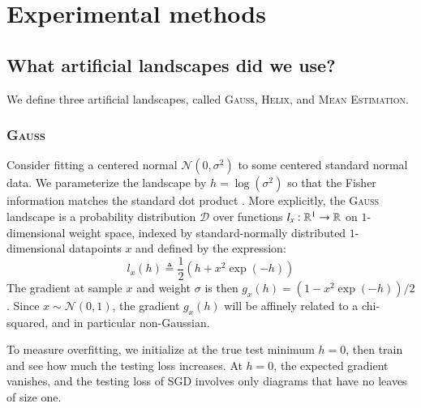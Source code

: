 \documentclass[anon,12pt]{colt2021} %
\newcommand{\wrap}[1]{\left(#1\right)}
\newcommand{\Dd}{\mathcal{D}}
\newcommand{\Nn}{\mathcal{N}}   \newcommand{\NN}{\mathbb{N}}
\newcommand{\Gauss}{\textsc{Gauss}}
\newcommand{\Helix}{\textsc{Helix}}
\newcommand{\MeanEstimation}{\textsc{Mean Estimation}}
\begin{document}
{%

\newpage
\section{Experimental methods}\label{appendix:experiments}

    \subsection{What artificial landscapes did we use?}             \label{appendix:artificial}

        We define three artificial landscapes, called
        \Gauss, \Helix, and \MeanEstimation.

        \subsubsection{\Gauss}
            Consider fitting a centered normal $\Nn(0, \sigma^2)$ to some
            centered standard normal data.  We parameterize the landscape by
            $h=\log(\sigma^2)$ so that the Fisher information matches the
            standard dot product \citep{am98}.   
            More explicitly, the \Gauss\, landscape is a probability
            distribution $\Dd$ over functions $l_x:\mathbb{R}^1\to \mathbb{R}$ on
            $1$-dimensional weight space, indexed by standard-normally
            distributed $1$-dimensional datapoints $x$ and defined by the
            expression:
            $$
                l_x(h)
                \triangleq
                \frac{1}{2} \wrap{h + x^2 \exp(-h)}
            $$
            The gradient at sample $x$ and weight $\sigma$ is then $g_x(h) =
            (1-x^2\exp(-h))/2$.  Since $x\sim \Nn(0, 1)$, the gradient $g_x(h)$
            will be affinely related to a chi-squared, and in particular
            non-Gaussian.
            
            To measure overfitting, we initialize at the true test minimum
            $h=0$, then train and see how much the testing loss increases.  At
            $h=0$, the expected gradient vanishes, and the testing loss of SGD
            involves only diagrams that have no leaves of size one.
            
}
\end{document}
